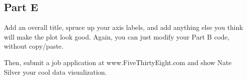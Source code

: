 \documentclass[11pt]{article}
\begin{document}
\subsection{Part E}\label{part-e}

Add an overall title, spruce up your axis labels, and add anything else
you think will make the plot look good. Again, you can just modify your
Part B code, without copy/paste.

Then, submit a job application at www.FiveThirtyEight.com and show Nate
Silver your cool data visualization.


    
    
    
    
\end{document}
